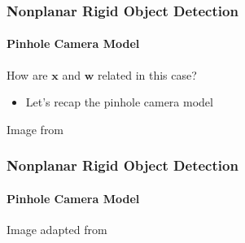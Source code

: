 \documentclass[xetex,professionalfont]{beamer}
\renewcommand{\vec}[1]{\ensuremath{\mathbf{#1}}}
\newcommand{\vw}{\vec{w}}
\newcommand{\vx}{\vec{x}}
\renewcommand\emph[1]{\textcolor{tuwcvl_inf_red}{#1}}
\begin{document}
\begin{frame}
\frametitle{Nonplanar Rigid Object Detection}
\framesubtitle{Pinhole Camera Model}

How are $\vx$ and $\vw$ related in this case?
\begin{itemize}
    \item Let's recap the \emph{pinhole camera model} %
\end{itemize}

\begin{center}
    {\centering Image from \cite{szeliski2010}}
\end{center}

\end{frame}


\begin{frame}
\frametitle{Nonplanar Rigid Object Detection}
\framesubtitle{Pinhole Camera Model}

\begin{center}
    {\centering Image adapted from \cite{prince12}}
\end{center}

\end{frame}
\end{document}
